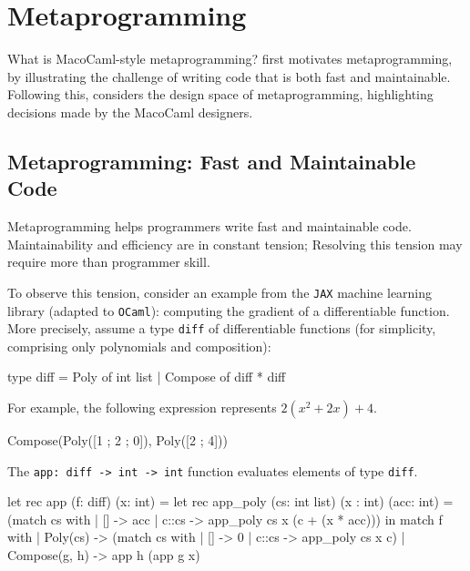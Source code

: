 \section{Metaprogramming}\label{section:metaprogramming-technical}
What is MacoCaml-style metaprogramming?  first motivates metaprogramming, by illustrating the challenge of writing code that is both fast and maintainable. Following this,  considers the design space of metaprogramming, highlighting decisions made by the MacoCaml designers.

\subsection{Metaprogramming: Fast and Maintainable Code}\label{subsection:metaprogramming-motivation}

Metaprogramming helps programmers write fast and maintainable code. Maintainability and efficiency are in constant tension; Resolving this tension may require more than programmer skill. 

To observe this tension, consider an example from the \texttt{JAX} machine learning library (adapted to \texttt{OCaml}): computing the gradient of a differentiable function. More precisely, assume a type \texttt{diff} of differentiable functions (for simplicity, comprising only polynomials and composition):

\begin{ocaml}
type diff = Poly of int list 
          | Compose of diff * diff
\end{ocaml}
For example, the following expression represents $2(x^2 + 2x) + 4$. 
\begin{ocaml}
Compose(Poly([1 ; 2 ; 0]), Poly([2 ; 4]))
\end{ocaml}

The \texttt{app: diff -> int -> int} function evaluates elements of type \texttt{diff}. 

\begin{ocaml}
let rec app (f: diff) (x: int) = 
  let rec app_poly (cs: int list) (x : int) (acc: int) = (match cs with 
    | [] -> acc 
    | c::cs -> app_poly cs x (c + (x * acc)))
  in match f with 
    | Poly(cs)      -> (match cs with 
                        | [] -> 0
                        | c::cs -> app_poly cs x c)
    | Compose(g, h) -> app h (app g x)
\end{ocaml}

